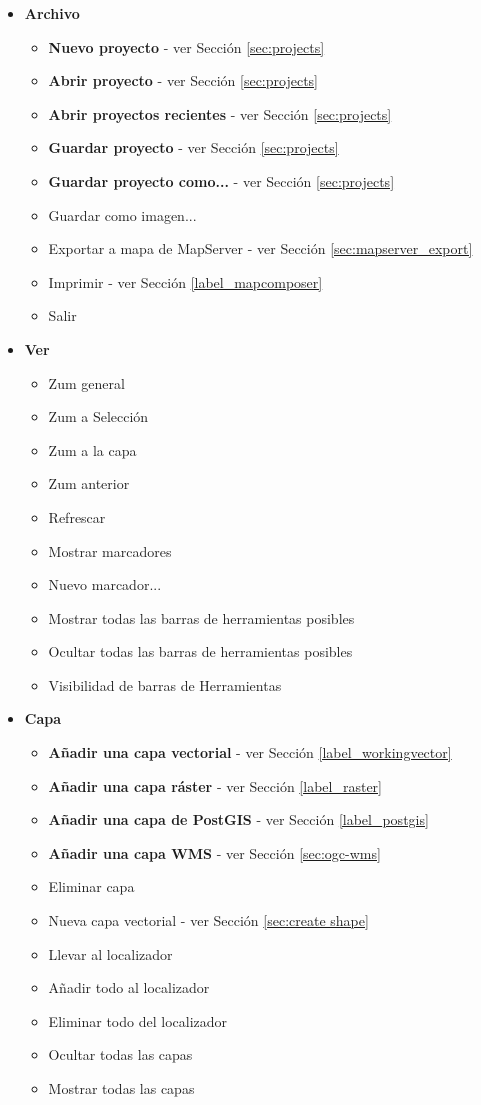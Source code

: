 \begin{itemize}

\item \textbf{Archivo}
\begin{itemize}
\item \textbf{Nuevo proyecto}          - ver Sección \ref{sec:projects}
\item \textbf{Abrir proyecto}         - ver Sección \ref{sec:projects}
\item \textbf{Abrir proyectos recientes} - ver Sección \ref{sec:projects}
\item \textbf{Guardar proyecto}         - ver Sección \ref{sec:projects}
\item \textbf{Guardar proyecto como...}      - ver Sección \ref{sec:projects}
\item Guardar como imagen...
\item Exportar a mapa de MapServer       - ver Sección \ref{sec:mapserver_export}
\item Imprimir                         - ver Sección \ref{label_mapcomposer}
\item Salir
\end{itemize}

\item \textbf{Ver}
\begin{itemize}
\item Zum general
\item Zum a Selección
\item Zum a la capa
\item Zum anterior
\item Refrescar
\item Mostrar marcadores
\item Nuevo marcador...
\item Mostrar todas las barras de herramientas posibles
\item Ocultar todas las barras de herramientas posibles
\item Visibilidad de barras de Herramientas 
\end{itemize}

\item \textbf{Capa}
\begin{itemize}
\item \textbf{Añadir una capa vectorial}       - ver Sección \ref{label_workingvector}
\item \textbf{Añadir una capa ráster}       - ver Sección \ref{label_raster}
\item \textbf{Añadir una capa de PostGIS}      - ver Sección \ref{label_postgis}
\item \textbf{Añadir una capa WMS}          - ver Sección \ref{sec:ogc-wms}
\item Eliminar capa
\item Nueva capa vectorial          	- ver Sección \ref{sec:create shape}
\item Llevar al localizador
\item Añadir todo al localizador
\item Eliminar todo del localizador
\item Ocultar todas las capas
\item Mostrar todas las capas
\end{itemize}


\end{itemize}
